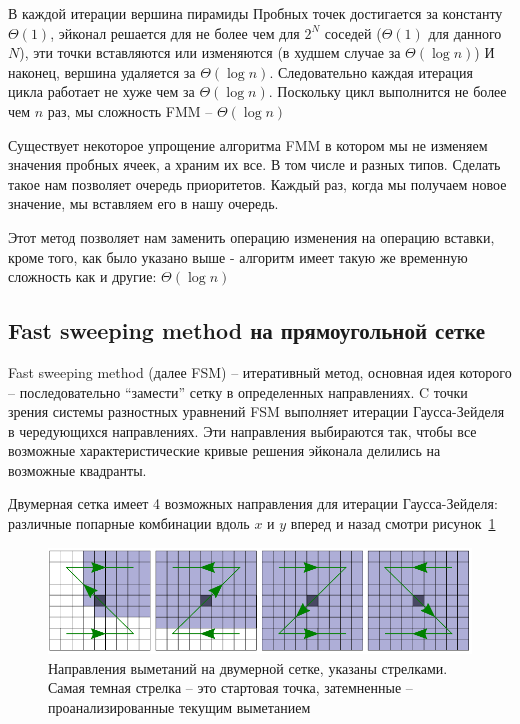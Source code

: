 В каждой итерации вершина пирамиды Пробных точек достигается за
константу $\Theta(1)$, эйконал решается для не более чем для $2^N$
соседей ($\Theta(1)$ для данного $N$), эти точки вставляются или
изменяются (в худшем случае за $\Theta(\log n)$) И наконец, вершина
удаляется за $\Theta(\log n)$. Следовательно каждая итерация цикла
работает не хуже чем за $\Theta(\log n)$. Поскольку цикл выполнится не
более чем $n$ раз, мы сложность FMM -- $\Theta(\log n)$

Существует некоторое упрощение алгоритма FMM в котором мы не изменяем
значения пробных ячеек, а храним их все. В том числе и разных
типов. Сделать такое нам позволяет очередь приоритетов. Каждый раз,
когда мы получаем новое значение, мы вставляем его в нашу очередь.

Этот метод позволяет нам заменить операцию изменения на операцию
вставки, кроме того, как было указано выше - алгоритм имеет такую же
временную сложность как и другие: $\Theta(\log n)$

\subsection{Fast sweeping method на прямоугольной сетке}
\label{sec:fast-sweeping-method}

Fast sweeping method (далее FSM) -- итеративный метод, основная идея
которого -- последовательно ``замести'' сетку в определенных
направлениях. C точки зрения системы разностных уравнений FSM
выполняет итерации Гаусса-Зейделя в чередующихся направлениях. Эти
направления выбираются так, чтобы все возможные характеристические
кривые решения эйконала делились на возможные квадранты.


Двумерная сетка имеет 4 возможных направления для итерации
Гаусса-Зейделя: различные попарные комбинации вдоль $x$ и $y$ вперед и
назад смотри рисунок~\ref{fig:fsm-sweeps}


\begin{figure}[H]
  \centering
  \includegraphics[width=\linewidth]{img/fsm-sweeps.png}
  \hfil \caption{Направления выметаний на двумерной сетке, указаны
    стрелками. Самая темная стрелка -- это стартовая точка,
    затемненные -- проанализированные текущим выметанием}
  \label{fig:fsm-sweeps}

\end{figure}

